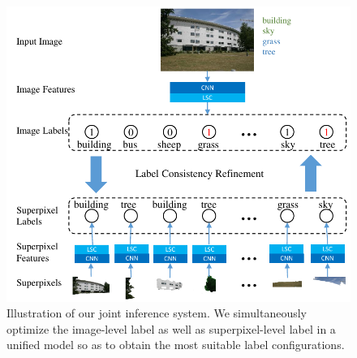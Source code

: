 \begin{figure}[t]
    \begin{center}
        \includegraphics[width=1\linewidth]{fig_framework.pdf}
    \end{center}
    \vspace{-3mm}
    \caption{Illustration of our joint inference system. We simultaneously optimize the image-level label as well as superpixel-level label in a unified model so as to obtain the most suitable label configurations.}
    \label{fig:framework}
\end{figure}

